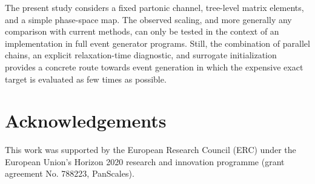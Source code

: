 \documentclass[11pt]{article}
\begin{document}
The present study considers a fixed partonic channel, tree-level matrix elements, and a simple phase-space map. 
The observed scaling, and more generally any comparison with current methods, can only be tested in the context of an implementation in full event generator programs.
Still, the combination of parallel chains, an explicit relaxation-time diagnostic, and surrogate initialization provides a concrete route towards event generation in which the expensive exact target is evaluated as few times as possible.

\section*{Acknowledgements}
This work was supported by the European Research Council (ERC) under the European Union’s Horizon 2020 research and innovation programme (grant agreement No. 788223, PanScales).



\end{document}
